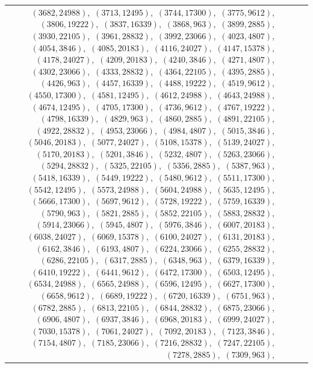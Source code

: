 \documentclass[11pt]{article}
\begin{document}
\begin{longtable}{@{}rrl>{\raggedright\arraybackslash}p{}@{}}
$(3682,24988)$,\allowbreak\ $(3713,12495)$,\allowbreak\ $(3744,17300)$,\allowbreak\ $(3775,9612)$,\allowbreak\ $(3806,19222)$,\allowbreak\ $(3837,16339)$,\allowbreak\ $(3868,963)$,\allowbreak\ $(3899,2885)$,\allowbreak\ $(3930,22105)$,\allowbreak\ $(3961,28832)$,\allowbreak\ $(3992,23066)$,\allowbreak\ $(4023,4807)$,\allowbreak\ $(4054,3846)$,\allowbreak\ $(4085,20183)$,\allowbreak\ $(4116,24027)$,\allowbreak\ $(4147,15378)$,\allowbreak\ $(4178,24027)$,\allowbreak\ $(4209,20183)$,\allowbreak\ $(4240,3846)$,\allowbreak\ $(4271,4807)$,\allowbreak\ $(4302,23066)$,\allowbreak\ $(4333,28832)$,\allowbreak\ $(4364,22105)$,\allowbreak\ $(4395,2885)$,\allowbreak\ $(4426,963)$,\allowbreak\ $(4457,16339)$,\allowbreak\ $(4488,19222)$,\allowbreak\ $(4519,9612)$,\allowbreak\ $(4550,17300)$,\allowbreak\ $(4581,12495)$,\allowbreak\ $(4612,24988)$,\allowbreak\ $(4643,24988)$,\allowbreak\ $(4674,12495)$,\allowbreak\ $(4705,17300)$,\allowbreak\ $(4736,9612)$,\allowbreak\ $(4767,19222)$,\allowbreak\ $(4798,16339)$,\allowbreak\ $(4829,963)$,\allowbreak\ $(4860,2885)$,\allowbreak\ $(4891,22105)$,\allowbreak\ $(4922,28832)$,\allowbreak\ $(4953,23066)$,\allowbreak\ $(4984,4807)$,\allowbreak\ $(5015,3846)$,\allowbreak\ $(5046,20183)$,\allowbreak\ $(5077,24027)$,\allowbreak\ $(5108,15378)$,\allowbreak\ $(5139,24027)$,\allowbreak\ $(5170,20183)$,\allowbreak\ $(5201,3846)$,\allowbreak\ $(5232,4807)$,\allowbreak\ $(5263,23066)$,\allowbreak\ $(5294,28832)$,\allowbreak\ $(5325,22105)$,\allowbreak\ $(5356,2885)$,\allowbreak\ $(5387,963)$,\allowbreak\ $(5418,16339)$,\allowbreak\ $(5449,19222)$,\allowbreak\ $(5480,9612)$,\allowbreak\ $(5511,17300)$,\allowbreak\ $(5542,12495)$,\allowbreak\ $(5573,24988)$,\allowbreak\ $(5604,24988)$,\allowbreak\ $(5635,12495)$,\allowbreak\ $(5666,17300)$,\allowbreak\ $(5697,9612)$,\allowbreak\ $(5728,19222)$,\allowbreak\ $(5759,16339)$,\allowbreak\ $(5790,963)$,\allowbreak\ $(5821,2885)$,\allowbreak\ $(5852,22105)$,\allowbreak\ $(5883,28832)$,\allowbreak\ $(5914,23066)$,\allowbreak\ $(5945,4807)$,\allowbreak\ $(5976,3846)$,\allowbreak\ $(6007,20183)$,\allowbreak\ $(6038,24027)$,\allowbreak\ $(6069,15378)$,\allowbreak\ $(6100,24027)$,\allowbreak\ $(6131,20183)$,\allowbreak\ $(6162,3846)$,\allowbreak\ $(6193,4807)$,\allowbreak\ $(6224,23066)$,\allowbreak\ $(6255,28832)$,\allowbreak\ $(6286,22105)$,\allowbreak\ $(6317,2885)$,\allowbreak\ $(6348,963)$,\allowbreak\ $(6379,16339)$,\allowbreak\ $(6410,19222)$,\allowbreak\ $(6441,9612)$,\allowbreak\ $(6472,17300)$,\allowbreak\ $(6503,12495)$,\allowbreak\ $(6534,24988)$,\allowbreak\ $(6565,24988)$,\allowbreak\ $(6596,12495)$,\allowbreak\ $(6627,17300)$,\allowbreak\ $(6658,9612)$,\allowbreak\ $(6689,19222)$,\allowbreak\ $(6720,16339)$,\allowbreak\ $(6751,963)$,\allowbreak\ $(6782,2885)$,\allowbreak\ $(6813,22105)$,\allowbreak\ $(6844,28832)$,\allowbreak\ $(6875,23066)$,\allowbreak\ $(6906,4807)$,\allowbreak\ $(6937,3846)$,\allowbreak\ $(6968,20183)$,\allowbreak\ $(6999,24027)$,\allowbreak\ $(7030,15378)$,\allowbreak\ $(7061,24027)$,\allowbreak\ $(7092,20183)$,\allowbreak\ $(7123,3846)$,\allowbreak\ $(7154,4807)$,\allowbreak\ $(7185,23066)$,\allowbreak\ $(7216,28832)$,\allowbreak\ $(7247,22105)$,\allowbreak\ $(7278,2885)$,\allowbreak\ $(7309,963)$,\allowbreak\ 
\end{longtable}
\end{document}

